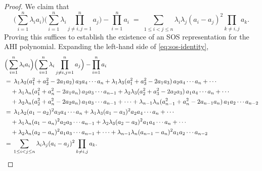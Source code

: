 \documentclass[10pt,a4paper]{amsart}
\begin{document}
\begin{proof}
We claim that
\begin{equation}\label{eq:sos-identity}
\Big(\sum_{i=1}^n \lambda_i a_i\Big) \Big(\sum_{i=1}^n \lambda_i \prod_{{j\neq i}, j=1}^n a_j\Big) - \prod_{i=1}^n a_i \;=\; \sum_{1\leq i<j\leq n} \lambda_i\lambda_j (a_i - a_j)^2\prod_{k\neq i,j}a_k .
\end{equation}
Proving this suffices to establish the existence of an SOS representation for the AHI polynomial. Expanding the left-hand side of \eqref{eq:sos-identity},
\[
\begin{aligned}
&\Big(\sum_{i=1}^n \lambda_i a_i\Big) \Big(\sum_{i=1}^n \lambda_i \prod_{{j\neq i}, j=1}^n a_j\Big) - \prod_{i=1}^n a_i\\
&=\, \lambda_1\lambda_2(a_{1}^2 + a_{2}^2 - 2a_{1}a_{2})\,a_{3}a_{4}\cdots a_{n}
 + \lambda_1\lambda_3(a_{1}^2 + a_{3}^2 - 2a_{1}a_{3})\,a_{2}a_{4}\cdots a_{n} + \cdots \\
&\quad + \lambda_1\lambda_n(a_{1}^2 + a_{n}^2 - 2a_{1}a_{n})\,a_{2}a_{3}\cdots a_{n-1}
 + \lambda_2\lambda_3(a_{2}^2 + a_{3}^2 - 2a_{2}a_{3})\,a_{1}a_{4}\cdots a_{n} + \cdots \\
&\quad + \lambda_2\lambda_n(a_{2}^2 + a_{n}^2 - 2a_{2}a_{n})\,a_{1}a_{3}\cdots a_{n-1} + \cdots
 + \lambda_{n-1}\lambda_n(a_{n-1}^2 + a_{n}^2 - 2a_{n-1}a_{n})\,a_{1}a_{2}\cdots a_{n-2}\\
&=\, \lambda_1\lambda_2 (a_{1}-a_{2})^{2} a_{3}a_{4}\cdots a_{n}
 + \lambda_1\lambda_3(a_{1}-a_{3})^{2} a_{2}a_{4}\cdots a_{n} + \cdots \\
&\quad + \lambda_1\lambda_n(a_{1}-a_{n})^{2} a_{2}a_{3}\cdots a_{n-1}
 + \lambda_2\lambda_3(a_{2}-a_{3})^{2} a_{1}a_{4}\cdots a_{n} + \cdots \\
&\quad + \lambda_2\lambda_n(a_{2}-a_{n})^{2} a_{1}a_{3}\cdots a_{n-1} + \cdots
 + \lambda_{n-1}\lambda_n(a_{n-1}-a_{n})^{2} a_{1}a_{2}\cdots a_{n-2}\\
&=\,\sum_{1\leq i<j\leq n}\lambda_i\lambda_j(a_i - a_j)^2\prod_{k\neq i,j}a_k. \qedhere
 \end{aligned}
\]
\end{proof}
\end{document}

